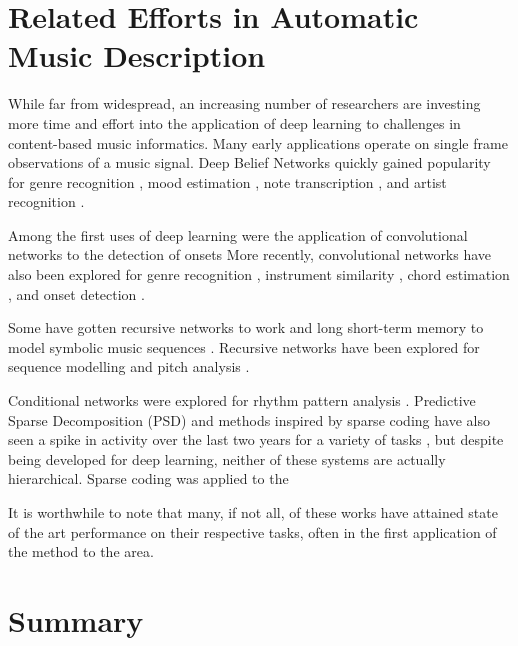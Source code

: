



\section{Related Efforts in Automatic Music Description}

While far from widespread, an increasing number of researchers are investing more time and effort into the application of deep learning to challenges in content-based music informatics.
Many early applications operate on single frame observations of a music signal.
Deep Belief Networks quickly gained popularity for genre recognition \cite{Hamel2009}, mood estimation \cite{Schmidt2011}, note transcription \cite{Nam2011}, and artist recognition \cite{Dieleman2011}.


Among the first uses of deep learning were the application of convolutional networks to the detection of onsets \cite{Lacoste2007}
More recently, convolutional networks have also been explored for genre recognition \cite{Li2010}, instrument similarity \cite{Humphrey2010}, chord estimation \cite{Humphrey2011, Humphrey2012b}, and onset detection \cite{Schluter2014}.
\cite{Durand2015}
\cite{Dieleman2014}

Some have gotten recursive networks to work
and long short-term memory to model symbolic music sequences \cite{Eck2008}.
\cite{BoulangerLewandowski2013}
\cite{Cherla2014}
Recursive networks have been explored for sequence modelling \cite{Boulanger2013} and pitch analysis \cite{Sigtia2014}.

Conditional networks were explored for rhythm pattern analysis \cite{Battenberg2012}.
Predictive Sparse Decomposition (PSD) and methods inspired by sparse coding have also seen a spike in activity over the last two years for a variety of tasks \cite{Henaff2011, Nam2012}, but despite being developed for deep learning, neither of these systems are actually hierarchical.
Sparse coding was applied to the
\cite{Smith2006}

It is worthwhile to note that many, if not all, of these works have attained state of the art performance on their respective tasks, often in the first application of the method to the area.


\section{Summary}
\label{sec:summary}

